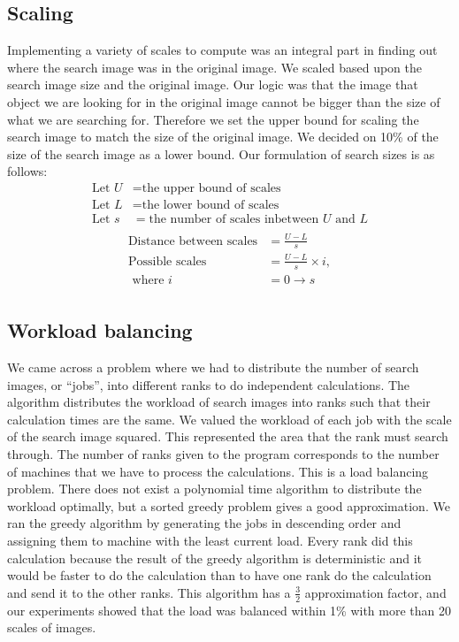 \documentclass[10pt, journal]{vgtc}                %
\newcommand\tab[1][1cm]{\hspace*{#1}}
\begin{document}
\subsection{Scaling}
\tab Implementing a variety of scales to compute was an integral part in finding out where the search image was in the original image. We scaled based upon the search image size and the original image. Our logic was that the image that object we are looking for in the original image cannot be bigger than the size of what we are searching for. Therefore we set the upper bound for scaling the search image to match the size of the original image. We decided on 10\% of the size of the search image as a lower bound. Our formulation of search sizes is as follows:
\begin{align*}
	\text{Let }U &= \text{the upper bound of scales}\\
	\text{Let }L &= \text{the lower bound of scales}\\
	\text{Let }s &= \text{the number of scales inbetween } U \text{ and } L\\
\end{align*}
\begin{align*}
	\text{Distance} \text{ between scales} &= \frac{U-L}{s}\\
	\text{Poss}\text{ible scales} &=  \frac{U-L}{s} \times i,\\
	\text{ where } i &= 0\rightarrow s\\
\end{align*}
\subsection{Workload balancing}
\tab We came across a problem where we had to distribute the number of search images, or “jobs”, into different ranks to do independent calculations. The algorithm distributes the workload of search images into ranks such that their calculation times are the same. We valued the workload of each job with the scale of the search image squared. This represented the area that the rank must search through. The number of ranks given to the program corresponds to the number of machines that we have to process the calculations. This is a load balancing problem. There does not exist a polynomial time algorithm to distribute the workload optimally, but a sorted greedy problem gives a good approximation. We ran the greedy algorithm by generating the jobs in descending order and assigning them to machine with the least current load. Every rank did this calculation because the result of the greedy algorithm is deterministic and it would be faster to do the calculation than to have one rank do the calculation and send it to the other ranks. This algorithm has a $\frac{3}{2}$ approximation factor, and our experiments showed that the load was balanced within 1\% with more than 20 scales of images.  
\end{document}
